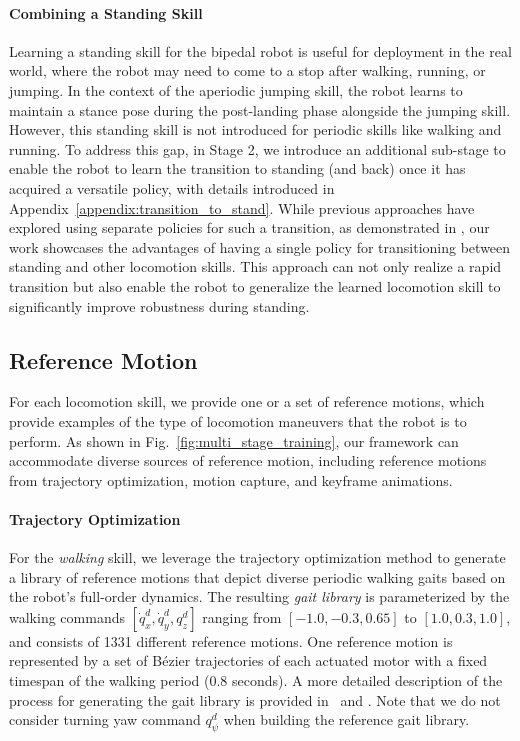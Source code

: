 \paragraph{Combining a Standing Skill} 
Learning a standing skill for the bipedal robot is useful for deployment in the real world, where the robot may need to come to a stop after walking, running, or jumping. 
In the context of the aperiodic jumping skill, the robot learns to maintain a stance pose during the post-landing phase alongside the jumping skill. 
However, this standing skill is not introduced for periodic skills like walking and running. 
To address this gap, in Stage 2, we introduce an additional sub-stage to enable the robot to learn the transition to standing (and back) once it has acquired a versatile policy, with details introduced in Appendix~\ref{appendix:transition_to_stand}.
While previous approaches have explored using separate policies for such a transition, as demonstrated in \cite{crowley2023optimizing}, our work showcases the advantages of having a single policy for transitioning between standing and other locomotion skills. 
This approach can not only realize a rapid transition but also enable the robot to generalize the learned locomotion skill to significantly improve robustness during standing.





\subsection{Reference Motion}
For each locomotion skill, we provide one or a set of reference motions, which provide examples of the type of locomotion maneuvers that the robot is to perform.
As shown in Fig.~\ref{fig:multi_stage_training}, our framework can accommodate diverse sources of reference motion, including reference motions from trajectory optimization, motion capture, and keyframe animations.



\paragraph{Trajectory Optimization}
For the \emph{walking} skill, we leverage the trajectory optimization method to generate a library of reference motions that depict diverse periodic walking gaits based on the robot's full-order dynamics.
The resulting \textit{gait library} is parameterized by the walking commands $[\dot{q}^d_x, \dot{q}^d_y, q^d_z]$ ranging from $[-1.0, -0.3, 0.65]$ to $[1.0, 0.3, 1.0]$, and consists of 1331 different reference motions.
One reference motion is represented by a set of B\'ezier trajectories of each actuated motor with a fixed timespan of the walking period (0.8 seconds). 
A more detailed description of the process for generating the gait library is provided in~\cite[Sec. III-B]{li2020animated} and \citep{hereid2019rapid}. 
Note that we do not consider turning yaw command $q^d_\psi$ when building the reference gait library.  

